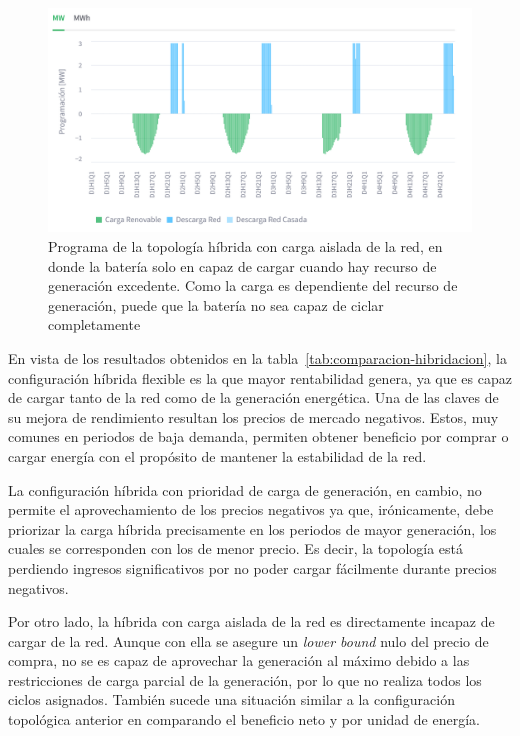 \begin{figure}
  \centering
  \includegraphics[width=0.75\linewidth]{figures/hibrida-aislada.png}
  \caption[Programa de la topología híbrida con carga aislada de la red.]{Programa de la topología híbrida con carga aislada de la red, en donde la batería solo en capaz de cargar cuando hay recurso de generación excedente. Como la carga es dependiente del recurso de generación, puede que la batería no sea capaz de ciclar completamente}%
  \label{fig:hibrida-aislada}
\end{figure}

En vista de los resultados obtenidos en la tabla~\ref{tab:comparacion-hibridacion}, la configuración híbrida flexible es la que mayor rentabilidad genera, ya que es capaz de cargar tanto de la red como de la generación energética. Una de las claves de su mejora de rendimiento resultan los precios de mercado negativos. Estos, muy comunes en periodos de baja demanda, permiten obtener beneficio por comprar o cargar energía con el propósito de mantener la estabilidad de la red.

La configuración híbrida con prioridad de carga de generación, en cambio, no permite el aprovechamiento de los precios negativos ya que, irónicamente, debe priorizar la carga híbrida precisamente en los periodos de mayor generación, los cuales se corresponden con los de menor precio. Es decir, la topología está perdiendo ingresos significativos por no poder cargar fácilmente durante precios negativos.

Por otro lado, la híbrida con carga aislada de la red es directamente incapaz de cargar de la red. Aunque con ella se asegure un \textit{lower bound} nulo del precio de compra, no se es capaz de aprovechar la generación al máximo debido a las restricciones de carga parcial de la generación, por lo que no realiza todos los ciclos asignados. También sucede una situación similar a la configuración topológica anterior en comparando el beneficio neto y por unidad de energía.

